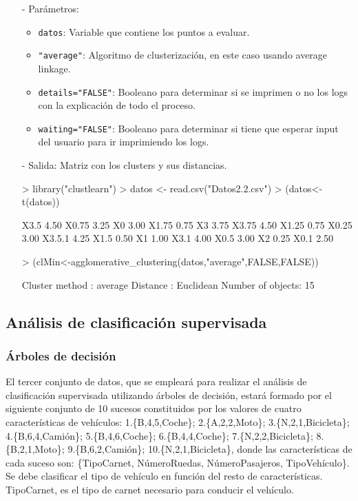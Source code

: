 \documentclass[a4paper, 12pt]{article}
\begin{document}
\begin{itemize}
		\begin{itemize}
			\item [-] Parámetros:
			\begin{itemize}
				\item \texttt{datos}: Variable que contiene los puntos a evaluar.
				\item \texttt{"average"}: Algoritmo de clusterización, en este caso usando average linkage.
				\item \texttt{details="FALSE"}: Booleano para determinar si se imprimen o no los logs con la explicación de todo el proceso.
				\item \texttt{waiting="FALSE"}: Booleano para determinar si tiene que esperar input del usuario para ir imprimiendo los logs.
			\end{itemize}
			\item [-] Salida: Matriz con los clusters y sus distancias.
\begin{Schunk}
\begin{Sinput}
> library("clustlearn")
> datos <- read.csv("Datos2.2.csv")
> (datos<-t(datos))
\end{Sinput}
\begin{Soutput}
       [,1]
X3.5   4.50
X0.75  3.25
X0     3.00
X1.75  0.75
X3     3.75
X3.75  4.50
X1.25  0.75
X0.25  3.00
X3.5.1 4.25
X1.5   0.50
X1     1.00
X3.1   4.00
X0.5   3.00
X2     0.25
X0.1   2.50
\end{Soutput}
\begin{Sinput}
> (clMin<-agglomerative_clustering(datos,"average",FALSE,FALSE))
\end{Sinput}
\begin{Soutput}
Cluster method   : average 
Distance         : Euclidean 
Number of objects: 15 
\end{Soutput}
\end{Schunk}
		\end{itemize}
	\end{itemize}
	
	\subsection{Análisis de clasificación supervisada}
	
	\subsubsection{Árboles de decisión}
	
	El tercer conjunto de datos, que se empleará para realizar el análisis de clasificación supervisada utilizando árboles de decisión, estará formado por el siguiente conjunto de 10 sucesos constituidos por los valores de cuatro características de vehículos: 1.\{B,4,5,Coche\}; 2.\{A,2,2,Moto\}; 3.\{N,2,1,Bicicleta\}; 4.\{B,6,4,Camión\}; 5.\{B,4,6,Coche\}; 6.\{B,4,4,Coche\}; 7.\{N,2,2,Bicicleta\}; 8.\{B,2,1,Moto\}; 9.\{B,6,2,Camión\}; 10.\{N,2,1,Bicicleta\}, donde las características de cada suceso son: \{TipoCarnet, NúmeroRuedas, NúmeroPasajeros, TipoVehículo\}. Se debe clasificar el tipo de vehículo en función del resto de características. TipoCarnet, es el tipo de carnet necesario para conducir el vehículo.
	
\end{document}
